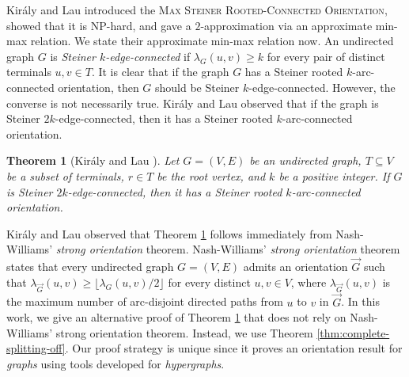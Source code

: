 \documentclass{article}
\newtheorem{theorem}{Theorem}[section]
\begin{document}
Kir\'{a}ly and Lau \cite{Kiraly-Lau} introduced the \textsc{Max Steiner Rooted-Connected Orientation}, showed that it is NP-hard, and gave a $2$-approximation via an approximate min-max relation. We state their approximate min-max relation now. 
An undirected graph $G$ is \emph{Steiner $k$-edge-connected} if $\lambda_G(u,v)\ge k$ 
for every pair of distinct terminals $u, v\in T$. 
It is clear that if the graph $G$ has a Steiner rooted $k$-arc-connected orientation, then $G$ should be Steiner $k$-edge-connected. However, the converse is not necessarily true. Kir\'{a}ly and Lau observed that if the graph is Steiner $2k$-edge-connected, then it has a Steiner rooted $k$-arc-connected orientation. 

\begin{theorem}[Kir\'{a}ly and Lau \cite{Kiraly-Lau}]\label{thm:rooted-steiner-orientation-in-graphs}
Let $G=(V, E)$ be an undirected graph, $T\subseteq V$ be a subset of terminals, $r\in T$ be the root vertex, and $k$ be a positive integer. If $G$ is Steiner $2k$-edge-connected, then it has a Steiner rooted $k$-arc-connected orientation. 
\end{theorem}

Kir\'{a}ly and Lau observed that Theorem \ref{thm:rooted-steiner-orientation-in-graphs} follows immediately from Nash-Williams' \emph{strong orientation} theorem. 
Nash-Williams' \emph{strong orientation} theorem \cite{NW60} states that every undirected graph $G=(V, E)$ admits an orientation $\overrightarrow{G}$ such that $\lambda_{\overrightarrow{G}}(u,v)\ge \lfloor \lambda_G(u,v)/2\rfloor$ for every distinct $u, v\in V$, where $\lambda_{\overrightarrow{G}}(u,v)$ is the maximum number of arc-disjoint directed paths from $u$ to $v$ in $\overrightarrow{G}$. 
In this work, we give an alternative proof of Theorem \ref{thm:rooted-steiner-orientation-in-graphs} that does not rely on Nash-Williams' strong orientation theorem. Instead, we use Theorem \ref{thm:complete-splitting-off}. 
Our proof strategy is unique since it proves an orientation result for \emph{graphs} using tools developed for \emph{hypergraphs}. 
\end{document}
